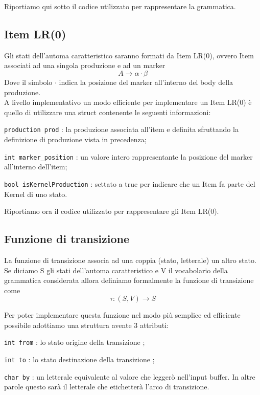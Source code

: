 \documentclass[12pt]{article}
\begin{document}
Riportiamo qui sotto il codice utilizzato per rappresentare la grammatica.




\subsection{Item LR(0)}
Gli stati dell'automa caratteristico saranno formati da Item LR(0), ovvero Item associati ad una singola produzione e ad un marker
$$
A \to \alpha\cdot\beta
$$ 
Dove il simbolo $\cdot$ indica la posizione del marker all'interno del body della produzione. \\

A livello implementativo un modo efficiente per implementare un Item LR(0) è quello di utilizzare una struct contenente le seguenti informazioni:
\begin{list}{-}{}
\item \texttt{production prod} : la produzione associata all'item e definita sfruttando la definizione di produzione vista in precedenza;
\item \texttt{int marker\_position} : un valore intero rappresentante la posizione del marker all'interno dell'item;
\item \texttt{bool isKernelProduction} : settato a true per indicare che un Item fa parte del Kernel di uno stato.
\end{list}

Riportiamo ora il codice utilizzato per rappresentare gli Item LR(0).


\subsection{Funzione di transizione}\label{tau}
La funzione di transizione associa ad una coppia (stato, letterale) un altro stato. Se diciamo S gli stati dell'automa caratteristico e V il vocabolario della grammatica considerata allora definiamo formalmente la funzione di transizione come
$$
\tau \colon (S, V) \to S
$$

Per poter implementare questa funzione nel modo più semplice ed efficiente possibile adottiamo una struttura avente 3 attributi:
\begin{list}{-}{}
\item \texttt{int from} : lo stato origine della transizione ;
\item \texttt{int to} : lo stato destinazione della transizione ;
\item \texttt{char by} : un letterale equivalente al valore che leggerò nell'input buffer. In altre parole questo sarà il letterale che etichetterà l'arco di transizione.
\end{list}
\end{document}

